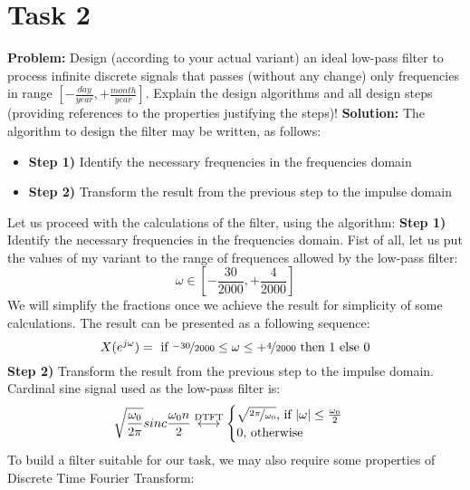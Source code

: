 \documentclass{article}
\begin{document}
\section{Task 2}
\textbf{Problem:}
Design (according to your actual variant) an ideal low-pass filter to process infinite discrete signals that passes (without any change) only frequencies in range $[-\frac{day}{year}, +\frac{month}{year}]$. Explain the design algorithms and all design steps (providing references to the properties justifying the steps)!
\newline
\textbf{Solution:}
The algorithm to design the filter may be written, as follows:
\begin{itemize}
    \item \textbf{Step 1)} Identify the necessary frequencies in the frequencies domain
    \item \textbf{Step 2)} Transform the result from the previous step to the impulse domain
\end{itemize}
Let us proceed with the calculations of the filter, using the algorithm:
\newline
\newline
\textbf{Step 1)} Identify the necessary frequencies in the frequencies domain.
\newline
Fist of all, let us put the values of my variant to the range of frequences allowed by the low-pass filter:
$$\omega \in [-\frac{30}{2000}, +\frac{4}{2000}]$$
We will simplify the fractions once we achieve the result for simplicity of some calculations.
The result can be presented as a following sequence:
$$
X(e^{j \omega}) = \text{ if } \nicefrac{-30}{2000} \le \omega \le +\nicefrac{4}{2000} \text{ then } 1 \text{ else } 0 
$$
\newline
\newline
\textbf{Step 2)} Transform the result from the previous step to the impulse domain.
\newline
Cardinal sine signal used as the low-pass filter is:
\begin{equation}
\label{eqn:sinc}
\sqrt{\frac{\omega_0}{2 \pi}} sinc \frac{\omega_0 n}{2} \stackrel{\mathrm{DTFT}}{\longleftrightarrow} 
\begin{cases}
\sqrt{\nicefrac{2\pi}{\omega_0}} \text{, if } |\omega|\le \frac{\omega_0}{2} \\
0 \text{, otherwise}
\end{cases}
\end{equation}
To build a filter suitable for our task, we may also require some properties of Discrete Time Fourier Transform:
\end{document}
